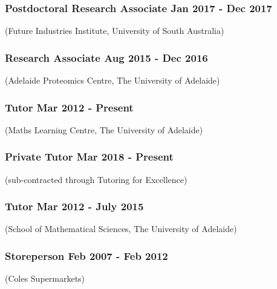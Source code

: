 \documentclass[a4paper,12pt]{report}
\begin{document}
\subsubsection*{Postdoctoral Research Associate  \hfill Jan 2017 - Dec 2017} \vspace{-6pt}
(Future Industries Institute, University of South Australia) \\[4pt]
\vspace{-0.6cm}

\subsubsection*{Research Associate  \hfill Aug 2015 - Dec 2016} \vspace{-6pt}
(Adelaide Proteomics Centre, The University of Adelaide) \\[4pt]
\vspace{-0.6cm}

\subsubsection*{Tutor \hfill Mar 2012 - Present} \vspace{-6pt}
(Maths Learning Centre, The University of Adelaide) \\[4pt]
\vspace{-0.6cm}

\subsubsection*{Private Tutor \hfill Mar 2018 - Present} \vspace{-6pt}
(sub-contracted through Tutoring for Excellence) \\[4pt]
\vspace{-0.6cm}

\subsubsection*{Tutor \hfill Mar 2012 - July 2015} \vspace{-6pt}
(School of Mathematical Sciences, The University of Adelaide) \\[4pt]
\vspace{-0.6cm}

\subsubsection*{Storeperson \hfill Feb 2007 - Feb 2012} \vspace{-6pt}
(Coles Supermarkets) \\[4pt]
\end{document}
